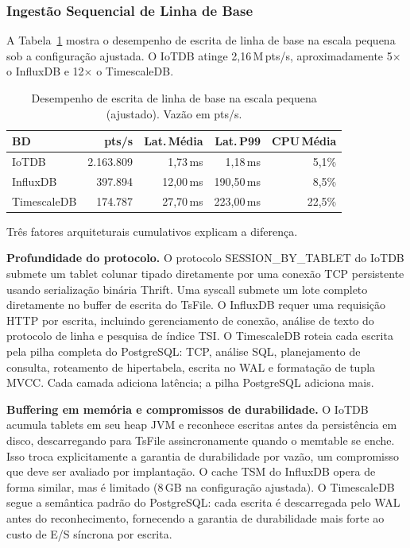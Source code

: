 \subsubsection{Ingestão Sequencial de Linha de Base}

A Tabela~\ref{tab:write-baseline} mostra o desempenho de escrita de linha de base na escala
pequena sob a configuração ajustada. O IoTDB atinge 2,16\,M\,pts/s, aproximadamente 5$\times$
o InfluxDB e 12$\times$ o TimescaleDB.

\begin{table}[t]
  \centering
  \caption{Desempenho de escrita de linha de base na escala pequena (ajustado). Vazão em pts/s.}
  \label{tab:write-baseline}
  \begin{tabular}{lrrrr}
    \hline
    \textbf{BD} & \textbf{pts/s} & \textbf{Lat.\,Média} & \textbf{Lat.\,P99} & \textbf{CPU\,Média} \\
    \hline
    IoTDB       & 2.163.809 &  1,73\,ms &   1,18\,ms &  5,1\% \\
    InfluxDB    &   397.894 & 12,00\,ms & 190,50\,ms &  8,5\% \\
    TimescaleDB &   174.787 & 27,70\,ms & 223,00\,ms & 22,5\% \\
    \hline
  \end{tabular}
\end{table}

Três fatores arquiteturais cumulativos explicam a diferença.

\textbf{Profundidade do protocolo.} O protocolo SESSION\_BY\_TABLET do IoTDB submete um tablet
colunar tipado diretamente por uma conexão TCP persistente usando serialização binária Thrift.
Uma syscall submete um lote completo diretamente no buffer de escrita do TsFile. O InfluxDB
requer uma requisição HTTP por escrita, incluindo gerenciamento de conexão, análise de texto do
protocolo de linha e pesquisa de índice TSI. O TimescaleDB roteia cada escrita pela pilha
completa do PostgreSQL: TCP, análise SQL, planejamento de consulta, roteamento de hipertabela,
escrita no WAL e formatação de tupla MVCC. Cada camada adiciona latência; a pilha PostgreSQL
adiciona mais.

\textbf{Buffering em memória e compromissos de durabilidade.} O IoTDB acumula tablets em seu
heap JVM e reconhece escritas antes da persistência em disco, descarregando para TsFile
assincronamente quando o memtable se enche. Isso troca explicitamente a garantia de durabilidade
por vazão, um compromisso que deve ser avaliado por implantação. O cache TSM do InfluxDB
opera de forma similar, mas é limitado (8\,GB na configuração ajustada). O TimescaleDB segue
a semântica padrão do PostgreSQL: cada escrita é descarregada pelo WAL antes do
reconhecimento, fornecendo a garantia de durabilidade mais forte ao custo de E/S síncrona
por escrita.

